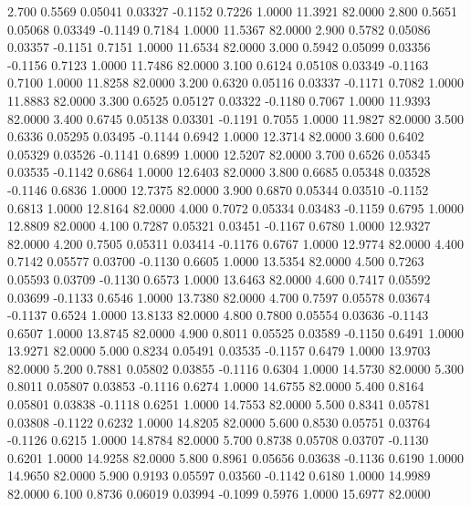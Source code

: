    2.700   0.5569   0.05041   0.03327  -0.1152   0.7226   1.0000  11.3921  82.0000
   2.800   0.5651   0.05068   0.03349  -0.1149   0.7184   1.0000  11.5367  82.0000
   2.900   0.5782   0.05086   0.03357  -0.1151   0.7151   1.0000  11.6534  82.0000
   3.000   0.5942   0.05099   0.03356  -0.1156   0.7123   1.0000  11.7486  82.0000
   3.100   0.6124   0.05108   0.03349  -0.1163   0.7100   1.0000  11.8258  82.0000
   3.200   0.6320   0.05116   0.03337  -0.1171   0.7082   1.0000  11.8883  82.0000
   3.300   0.6525   0.05127   0.03322  -0.1180   0.7067   1.0000  11.9393  82.0000
   3.400   0.6745   0.05138   0.03301  -0.1191   0.7055   1.0000  11.9827  82.0000
   3.500   0.6336   0.05295   0.03495  -0.1144   0.6942   1.0000  12.3714  82.0000
   3.600   0.6402   0.05329   0.03526  -0.1141   0.6899   1.0000  12.5207  82.0000
   3.700   0.6526   0.05345   0.03535  -0.1142   0.6864   1.0000  12.6403  82.0000
   3.800   0.6685   0.05348   0.03528  -0.1146   0.6836   1.0000  12.7375  82.0000
   3.900   0.6870   0.05344   0.03510  -0.1152   0.6813   1.0000  12.8164  82.0000
   4.000   0.7072   0.05334   0.03483  -0.1159   0.6795   1.0000  12.8809  82.0000
   4.100   0.7287   0.05321   0.03451  -0.1167   0.6780   1.0000  12.9327  82.0000
   4.200   0.7505   0.05311   0.03414  -0.1176   0.6767   1.0000  12.9774  82.0000
   4.400   0.7142   0.05577   0.03700  -0.1130   0.6605   1.0000  13.5354  82.0000
   4.500   0.7263   0.05593   0.03709  -0.1130   0.6573   1.0000  13.6463  82.0000
   4.600   0.7417   0.05592   0.03699  -0.1133   0.6546   1.0000  13.7380  82.0000
   4.700   0.7597   0.05578   0.03674  -0.1137   0.6524   1.0000  13.8133  82.0000
   4.800   0.7800   0.05554   0.03636  -0.1143   0.6507   1.0000  13.8745  82.0000
   4.900   0.8011   0.05525   0.03589  -0.1150   0.6491   1.0000  13.9271  82.0000
   5.000   0.8234   0.05491   0.03535  -0.1157   0.6479   1.0000  13.9703  82.0000
   5.200   0.7881   0.05802   0.03855  -0.1116   0.6304   1.0000  14.5730  82.0000
   5.300   0.8011   0.05807   0.03853  -0.1116   0.6274   1.0000  14.6755  82.0000
   5.400   0.8164   0.05801   0.03838  -0.1118   0.6251   1.0000  14.7553  82.0000
   5.500   0.8341   0.05781   0.03808  -0.1122   0.6232   1.0000  14.8205  82.0000
   5.600   0.8530   0.05751   0.03764  -0.1126   0.6215   1.0000  14.8784  82.0000
   5.700   0.8738   0.05708   0.03707  -0.1130   0.6201   1.0000  14.9258  82.0000
   5.800   0.8961   0.05656   0.03638  -0.1136   0.6190   1.0000  14.9650  82.0000
   5.900   0.9193   0.05597   0.03560  -0.1142   0.6180   1.0000  14.9989  82.0000
   6.100   0.8736   0.06019   0.03994  -0.1099   0.5976   1.0000  15.6977  82.0000
